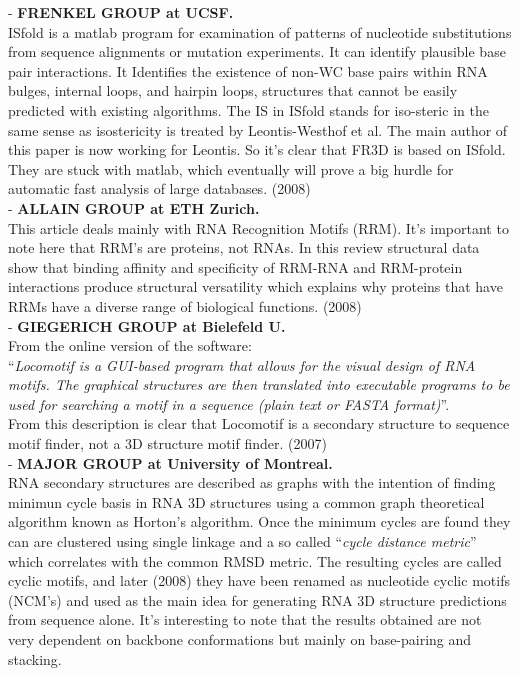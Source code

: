 - \textbf{FRENKEL GROUP at UCSF.}\\
ISfold is a matlab program for examination of patterns of nucleotide substitutions
from  sequence   alignments  or  mutation  experiments.  It can
identify plausible base  pair interactions. It Identifies the
existence of non-WC base pairs within RNA  bulges, internal  loops,
and hairpin  loops, structures that cannot be easily
predicted   with   existing algorithms. The IS in ISfold stands for
iso-steric in the same sense as isostericity is treated by Leontis-Westhof et al.
The main author of this paper is now working for Leontis. So it's
clear that FR3D is based on ISfold. They are stuck with matlab, which
eventually will prove a big hurdle for automatic fast analysis of
large databases. (2008)
\cite{mokdad2008}\\

- \textbf{ALLAIN GROUP at ETH Zurich.}\\
This article deals mainly with RNA Recognition Motifs (RRM). It's
important to note here that RRM's are proteins, not RNAs. In this
review structural data show that binding affinity and
specificity of RRM-RNA and RRM-protein interactions produce structural
versatility which explains why proteins that have RRMs have a diverse
range of biological functions. (2008)
\cite{clery2008}\\

- \textbf{GIEGERICH GROUP at Bielefeld U.}\\
From the online version of the software:\\
``\textit{Locomotif is a GUI-based program that allows for the visual design of
RNA motifs. The graphical structures are then translated into
executable programs to be used for searching a motif in a sequence
(plain text or FASTA format)}''.\\
From this description is clear that Locomotif is a secondary structure
to sequence motif finder, not a 3D structure motif finder. (2007)
\cite{reeder2007}\\

- \textbf{MAJOR GROUP at University of Montreal.}\\
RNA secondary structures are described as graphs with the intention of
finding minimun cycle basis in RNA 3D structures using a common graph
theoretical algorithm known as Horton's algorithm. Once the minimum cycles are
found they can are clustered using single linkage and a so called
``\textit{cycle distance metric}'' which correlates with the common RMSD
metric. The resulting cycles are called cyclic motifs, and later (2008) they
have been renamed as nucleotide cyclic motifs (NCM's) and used as the
main idea for generating RNA 3D structure predictions from sequence alone.
It's interesting to note that the results obtained are not very
dependent on backbone conformations but mainly on base-pairing and stacking.
\cite{lemieux2006}\\

